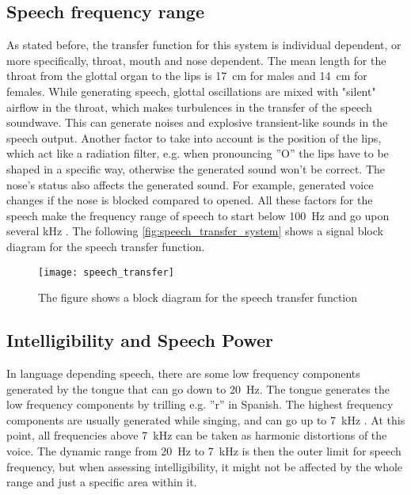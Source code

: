 \subsection{Speech frequency range}

As stated before, the transfer function for this system is individual dependent, or more specifically, throat, mouth and nose dependent. The mean length for the throat from the glottal organ to the lips is \SI{17}{\centi\meter} for males and \SI{14}{\centi\meter} for females. While generating speech, glottal oscillations are mixed with "silent" airflow in the throat, which makes turbulences in the transfer of the speech soundwave. This can generate noises and explosive transient-like sounds in the speech output. Another factor to take into account is the position of the lips, which act like a radiation filter, e.g. when pronouncing ''O'' the lips have to be shaped in a specific way, otherwise the generated sound won't be correct. The nose's status also affects the generated sound. For example, generated voice changes if the nose is blocked compared to opened. All these factors for the speech make the frequency range of speech to start below \SI{100}{\hertz} and go upon several \si{\kilo\hertz} \citep{pulkki2015}. The following \autoref{fig:speech_transfer_system} shows a signal block diagram for the speech transfer function.

 \begin{figure}[H]
	\centering
		\texttt{[image: speech\_transfer]}
		\caption{The figure shows a block diagram for the speech transfer function \citep{pulkki2015}}
		\label{fig:speech_transfer_system}
\end{figure}

\subsection{Intelligibility and Speech Power}

In language depending speech, there are some low frequency components generated by the tongue that can go down to \SI{20}{\hertz}. The tongue generates the low frequency components by trilling e.g. ''r'' in Spanish. The highest frequency components are usually generated while singing, and can go up to \SI{7}{\kilo\hertz} \citep{pulkki2015}. At this point, all frequencies above \SI{7}{\kilo\hertz} can be taken as harmonic distortions of the voice. The dynamic range from \SI{20}{\hertz} to \SI{7}{\kilo\hertz} is then the outer limit for speech frequency, but when assessing intelligibility, it might not be affected by the whole range and just a specific area within it.

